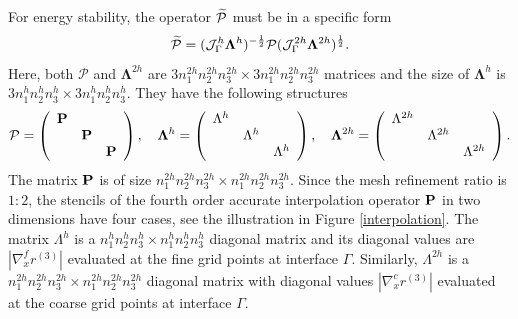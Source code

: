 For energy stability, the operator $ \widetilde{\mathcal{P}}$ must be in a specific form 
\[\widetilde{\mathcal{P}} = (\mathcal{J}^h_\Gamma \bm{\Lambda}^h)^{-\frac{1}{2}}\mathcal{P}(\mathcal{J}^{2h}_\Gamma \bm{\Lambda}^{2h})^{\frac{1}{2}}.\]
Here, both  $\mathcal{P}$ and $\bm{\Lambda}^{2h}$ are $3n_1^{2h}n_2^{2h}n_3^{2h}\times 3n_1^{2h}n_2^{2h}n_3^{2h}$ matrices and the size of $\bm{\Lambda}^{h}$ is $3n_1^{h}n_2^{h}n_3^{h}\times 3n_1^{h}n_2^{h}n_3^{h}$. They have the following structures
\begin{align*}\label{iandr}
\mathcal{P} = \left(\begin{array}{ccc}
{\bf P}& ~  & ~ \\
~ & {\bf P} & ~ \\
~ &~  &{\bf P}\end{array}\right), \ \ \ 
\bm{\Lambda}^h = \left(\begin{array}{ccc}
\Lambda^h& ~  & ~ \\
~ & \Lambda^h & ~ \\
~ &~  &\Lambda^h\end{array}\right), \ \ \ \bm{\Lambda}^{2h} = \left(\begin{array}{ccc}
\Lambda^{2h}& ~  & ~ \\
~ & \Lambda^{2h} & ~ \\
~ &~  &\Lambda^{2h}\end{array}\right).
\end{align*}
The matrix $\bf P$ is of size $n_1^{2h}n_2^{2h}n_3^{2h}\times n_1^{2h}n_2^{2h}n_3^{2h}$. Since the mesh refinement ratio is $1:2$, the stencils of the fourth order accurate interpolation operator ${\bf P}$ in two dimensions have four cases, see the illustration in  Figure \ref{interpolation}. 
The matrix $\Lambda^{h}$ is a $n_1^{h}n_2^{h}n_3^{h}\times n_1^{h}n_2^{h}n_3^{h}$ diagonal matrix and its diagonal values are $|\nabla_x^f r^{(3)}|$ evaluated at the fine grid points at interface $\Gamma$. Similarly, $\Lambda^{2h}$ is a $n_1^{2h}n_2^{2h}n_3^{2h}\times n_1^{2h}n_2^{2h}n_3^{2h}$ diagonal matrix with diagonal values  $|\nabla_x^c r^{(3)}|$ evaluated at the coarse grid points at interface $\Gamma$.


